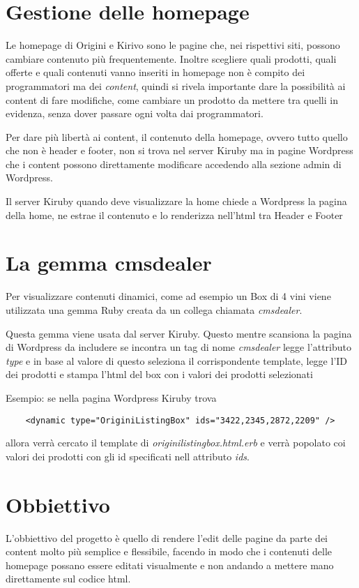 \section{Gestione delle homepage} 	

Le homepage di Origini e Kirivo sono le pagine che, nei rispettivi siti, possono cambiare contenuto più 
frequentemente. Inoltre scegliere quali prodotti, quali offerte e quali contenuti 
vanno inseriti in homepage non è compito dei programmatori ma dei \emph{content},
quindi si rivela importante dare la possibilità ai content di fare modifiche, come cambiare un prodotto da
mettere tra quelli in evidenza, senza dover passare ogni volta dai programmatori.

Per dare più libertà ai content, il contenuto della homepage, ovvero tutto quello che non è
header e footer, non si trova nel server Kiruby ma in pagine Wordpress che i content possono direttamente 
modificare accedendo alla sezione admin di Wordpress.

Il server Kiruby quando deve visualizzare la home chiede a Wordpress la pagina della home, ne estrae
il contenuto e lo renderizza nell'html tra Header e Footer

\section{La gemma cmsdealer}
Per visualizzare contenuti dinamici, come ad esempio un Box di 4 vini viene utilizzata
una gemma Ruby creata da un collega chiamata \emph{cmsdealer}.

Questa gemma viene usata dal server Kiruby. Questo mentre scansiona la pagina di Wordpress da includere
se incontra un tag di nome \emph{cmsdealer} legge l'attributo \emph{type} e in base al valore di questo
seleziona il corrispondente template, legge l'ID dei prodotti e stampa l'html del box con
i valori dei prodotti selezionati

Esempio: se nella pagina Wordpress Kiruby trova
\begin{verbatim}
	<dynamic type="OriginiListingBox" ids="3422,2345,2872,2209" />
\end{verbatim}
allora verrà cercato il template di \emph{originilistingbox.html.erb} e verrà popolato
coi valori dei prodotti con gli id specificati nell attributo \emph{ids}.


\newpage
\section{Obbiettivo}
L'obbiettivo del progetto è quello di rendere l'edit delle pagine
da parte dei content molto più semplice e flessibile,
facendo in modo che i contenuti delle homepage possano essere editati visualmente e non
andando a mettere mano direttamente sul codice html.


